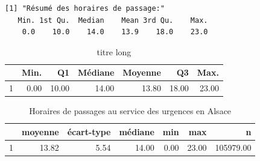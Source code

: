 \documentclass[12pt,english,french,twoside]{report}\usepackage[]{graphicx}\usepackage[]{color}
\makeatletter
\newenvironment{kframe}{%
 \def\at@end@of@kframe{}%
 \ifinner\ifhmode%
  \def\at@end@of@kframe{\end{minipage}}%
  \begin{minipage}{\columnwidth}%
 \fi\fi%
 \def\FrameCommand##1{\hskip\@totalleftmargin \hskip-\fboxsep
 \colorbox{shadecolor}{##1}\hskip-\fboxsep
     \hskip-\linewidth \hskip-\@totalleftmargin \hskip\columnwidth}%
 \MakeFramed {\advance\hsize-\width
   \@totalleftmargin\z@ \linewidth\hsize
   \@setminipage}}%
 {\par\unskip\endMakeFramed%
 \at@end@of@kframe}
\newenvironment{knitrout}{}{} %
\makeatother
\begin{document}
\begin{knitrout}
\color{fgcolor}\begin{kframe}
\begin{verbatim}
[1] "Résumé des horaires de passage:"
   Min. 1st Qu.  Median    Mean 3rd Qu.    Max. 
    0.0    10.0    14.0    13.9    18.0    23.0 
\end{verbatim}
\end{kframe}
\end{knitrout}


\begin{table}[ht]
\centering
\begin{tabular}{rrrrrrr}
\hline
& Min. & Q1 & Médiane & Moyenne & Q3 & Max. \\
\hline
1 & 0.00 & 10.00 & 14.00 & 13.80 & 18.00 & 23.00 \\
\hline
\end{tabular}
\caption[titre court]{titre long}
\label{lab}
\end{table}


\begin{table}[ht]
\centering
\begin{tabular}{rrrrrrr}
\hline
& moyenne & écart-type & médiane & min & max & n \\
\hline
1 & 13.82 & 5.54 & 14.00 & 0.00 & 23.00 & 105979.00 \\
\hline
\end{tabular}
\caption[Horaires de passage]{Horaires de passages au service des urgences en Alsace}
\label{hor:pass}
\end{table}


\end{document}
